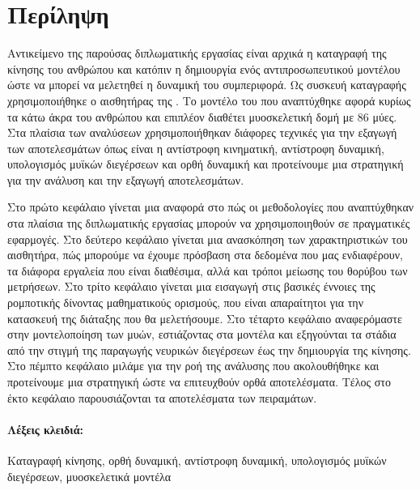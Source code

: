 \section*{Περίληψη}

Αντικείμενο της παρούσας διπλωματικής εργασίας είναι αρχικά η καταγραφή της κίνησης του ανθρώπου και κατόπιν η δημιουργία ενός αντιπροσωπευτικού μοντέλου ώστε να μπορεί να μελετηθεί η δυναμική του συμπεριφορά. Ως συσκευή καταγραφής χρησιμοποιήθηκε ο αισθητήρας  της . Το μοντέλο του που αναπτύχθηκε αφορά κυρίως τα κάτω άκρα του ανθρώπου και επιπλέον διαθέτει μυοσκελετική δομή με 86 μύες. Στα πλαίσια των αναλύσεων χρησιμοποιήθηκαν διάφορες τεχνικές για την εξαγωγή των αποτελεσμάτων όπως είναι η αντίστροφη κινηματική, αντίστροφη δυναμική, υπολογισμός μυϊκών διεγέρσεων και ορθή δυναμική και προτείνουμε μια στρατηγική για την ανάλυση και την εξαγωγή αποτελεσμάτων.

Στο πρώτο κεφάλαιο γίνεται μια αναφορά στο πώς οι μεθοδολογίες που αναπτύχθηκαν στα πλαίσια της διπλωματικής εργασίας μπορούν να χρησιμοποιηθούν σε πραγματικές εφαρμογές. Στο δεύτερο κεφάλαιο γίνεται μια ανασκόπηση των χαρακτηριστικών του αισθητήρα, πώς μπορούμε να έχουμε πρόσβαση στα δεδομένα που μας ενδιαφέρουν, τα διάφορα εργαλεία που είναι διαθέσιμα, αλλά και τρόποι μείωσης του θορύβου των μετρήσεων. Στο τρίτο κεφάλαιο γίνεται μια εισαγωγή στις βασικές έννοιες της ρομποτικής δίνοντας μαθηματικούς ορισμούς, που είναι απαραίτητοι για την κατασκευή της διάταξης που θα μελετήσουμε. Στο τέταρτο κεφάλαιο αναφερόμαστε στην μοντελοποίηση των μυών, εστιάζοντας στα μοντέλα  και εξηγούνται τα στάδια από την στιγμή της παραγωγής νευρικών διεγέρσεων έως την δημιουργία της κίνησης. Στο πέμπτο κεφάλαιο μιλάμε για την ροή της ανάλυσης που ακολουθήθηκε και προτείνουμε μια στρατηγική ώστε να επιτευχθούν ορθά αποτελέσματα. Τέλος στο έκτο κεφάλαιο παρουσιάζονται τα αποτελέσματα των πειραμάτων.


\paragraph{\textbf{Λέξεις κλειδιά:}}Καταγραφή κίνησης, ορθή δυναμική, αντίστροφη δυναμική, υπολογισμός μυϊκών διεγέρσεων, μυοσκελετικά μοντέλα

\thispagestyle{empty}
\clearpage\mbox{}
\thispagestyle{empty}
\clearpage

